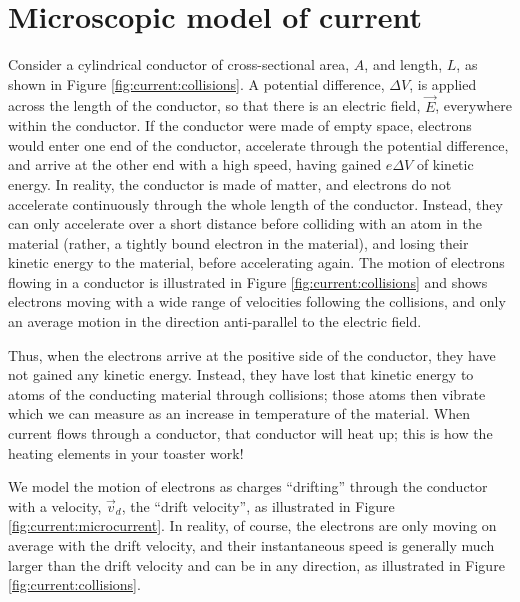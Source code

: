\section{Microscopic model of current}
\label{sec:current:micromodel}
Consider a cylindrical conductor of cross-sectional area, $A$, and length, $L$, as shown in Figure \ref{fig:current:collisions}. A potential difference, $\Delta V$, is applied across the length of the conductor, so that there is an electric field, $\vec E$, everywhere within the conductor. If the conductor were made of empty space, electrons would enter one end of the conductor, accelerate through the potential difference, and arrive at the other end with a high speed, having gained $e\Delta V$ of kinetic energy. In reality, the conductor is made of matter, and electrons do not accelerate continuously through the whole length of the conductor. Instead, they can only accelerate over a short distance before colliding with an atom in the material (rather, a tightly bound electron in the material), and losing their kinetic energy to the material, before accelerating again. The motion of electrons flowing in a conductor is illustrated in Figure \ref{fig:current:collisions} and shows electrons moving with a wide range of velocities following the collisions, and only an average motion in the direction anti-parallel to the electric field.

Thus, when the electrons arrive at the positive side of the conductor, they have not gained any kinetic energy. Instead, they have lost that kinetic energy to atoms of the conducting material through collisions; those atoms then vibrate which we can measure as an increase in temperature of the material. When current flows through a conductor, that conductor will heat up; this is how the heating elements in your toaster work!

We model the motion of electrons as charges ``drifting'' through the conductor with a velocity, $\vec v_d$, the ``drift velocity'', as illustrated in Figure \ref{fig:current:microcurrent}. In reality, of course, the electrons are only moving on average with the drift velocity, and their instantaneous speed is generally much larger than the drift velocity and can be in any direction, as illustrated in Figure \ref{fig:current:collisions}. 

